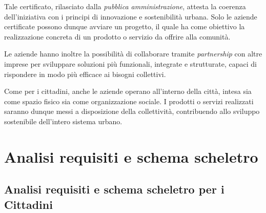\documentclass{article}
\begin{document}
\par\vspace{0.3cm}

Tale certificato, rilasciato dalla \textit{pubblica amministrazione}, attesta la coerenza dell’iniziativa con i principi di innovazione e sostenibilità urbana. Solo le aziende certificate possono dunque avviare un progetto, il quale ha come obiettivo la realizzazione concreta di un prodotto o servizio da offrire alla comunità.

\par\vspace{0.3cm}

Le aziende hanno inoltre la possibilità di collaborare tramite \textit{partnership} con altre imprese per sviluppare soluzioni più funzionali, integrate e strutturate, capaci di rispondere in modo più efficace ai bisogni collettivi.

\par\vspace{0.3cm}

Come per i cittadini, anche le aziende operano all’interno della città, intesa sia come spazio fisico sia come organizzazione sociale. I prodotti o servizi realizzati saranno dunque messi a disposizione della collettività, contribuendo allo sviluppo sostenibile dell’intero sistema urbano.





\newpage
\section{Analisi requisiti e schema scheletro}


\subsection{Analisi requisiti e schema scheletro per i Cittadini}
\end{document}
